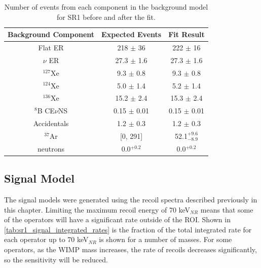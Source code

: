 \begin{table}[]
    \centering
    \begin{tabular}{c|c|c}
        Background Component     & Expected Events & Fit Result             \\ \hline
        Flat ER                  & 218 $\pm$ 36    & 222 $\pm$ 16           \\
        $\nu$ ER                 & 27.3 $\pm$ 1.6  & 27.3 $\pm$ 1.6         \\
        ${}^{127}$Xe             & 9.3 $\pm$ 0.8   & 9.3 $\pm$ 0.8          \\
        ${}^{124}$Xe             & 5.0 $\pm$ 1.4   & 5.2 $\pm$ 1.4          \\
        ${}^{136}$Xe             & 15.2 $\pm$ 2.4  & 15.3 $\pm$ 2.4         \\
        ${}^{8}$B CE$\nu$NS      & 0.15 $\pm$ 0.01 & 0.15 $\pm$ 0.01        \\
        Accidentals              & 1.2 $\pm$ 0.3   & 1.2 $\pm$ 0.3          \\
        ${}^{37}$Ar              & [0, 291]        & 52.1${}^{+9.6}_{-8.9}$ \\
        neutrons                 & 0.0${}^{+0.2}$  & 0.0${}^{+0.2}$
    \end{tabular}
    \caption{Number of events from each component in the background model for SR1 before and after the fit.}
    \label{tab:sr1_ws_lz_backgrounds}
\end{table}


\subsection{Signal Model}
\par
The signal models were generated using the recoil spectra described previously in this chapter.
Limiting the maximum recoil energy of 70 keV$_{NR}$ means that some of the operators will have a significant rate outside of the ROI.
Shown in \autoref{tab:sr1_signal_integrated_rates} is the fraction of the total integrated rate for each operator up to 70 keV$_{NR}$ is shown for a number of masses.
For some operators, as the WIMP mass increases, the rate of recoils decreases significantly, so the sensitivity will be reduced. 


